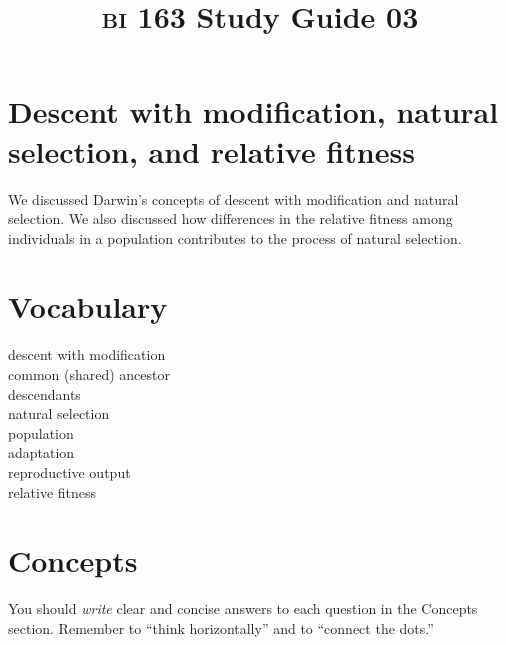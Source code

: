 \documentclass[letterpaper]{tufte-handout}
\title{{\scshape bi} 163 Study Guide 03}
\date{} %
\begin{document}
\maketitle	%

\section*{Descent with modification, natural selection, and relative fitness}

We discussed Darwin's concepts of descent with modification and natural selection. We also discussed how differences in the relative fitness among individuals in a population contributes to the process of natural selection.

\section*{Vocabulary}

\vspace{-1\baselineskip}
\begin{multicols}{2}
descent with modification\\
common (shared) ancestor \\
descendants \\
natural selection \\
population \\
adaptation \\
reproductive output \\
relative fitness
\end{multicols}

\section*{Concepts}

You should \emph{write} clear and concise answers to each question in the Concepts section.  Remember to ``think horizontally'' and to ``connect the dots.'' 
\end{document}

